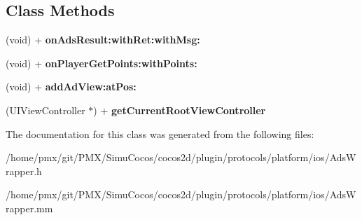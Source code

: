 \subsection*{Class Methods}
\begin{DoxyCompactItemize}
\item 
\mbox{\label{interfaceAdsWrapper_a48ad51ca0aa586ed10352eb433e24b91}} 
(void) + {\bfseries on\+Ads\+Result\+:with\+Ret\+:with\+Msg\+:}
\item 
\mbox{\label{interfaceAdsWrapper_af463db8bddd3580d69894c1b44ccb020}} 
(void) + {\bfseries on\+Player\+Get\+Points\+:with\+Points\+:}
\item 
\mbox{\label{interfaceAdsWrapper_a2b9ea47caa677d29c87ce5821f4f8fb3}} 
(void) + {\bfseries add\+Ad\+View\+:at\+Pos\+:}
\item 
\mbox{\label{interfaceAdsWrapper_ae9f3bd59f9655b009ce282cb7a0d2988}} 
(U\+I\+View\+Controller $\ast$) + {\bfseries get\+Current\+Root\+View\+Controller}
\end{DoxyCompactItemize}


The documentation for this class was generated from the following files\+:\begin{DoxyCompactItemize}
\item 
/home/pmx/git/\+P\+M\+X/\+Simu\+Cocos/cocos2d/plugin/protocols/platform/ios/Ads\+Wrapper.\+h\item 
/home/pmx/git/\+P\+M\+X/\+Simu\+Cocos/cocos2d/plugin/protocols/platform/ios/Ads\+Wrapper.\+mm\end{DoxyCompactItemize}

